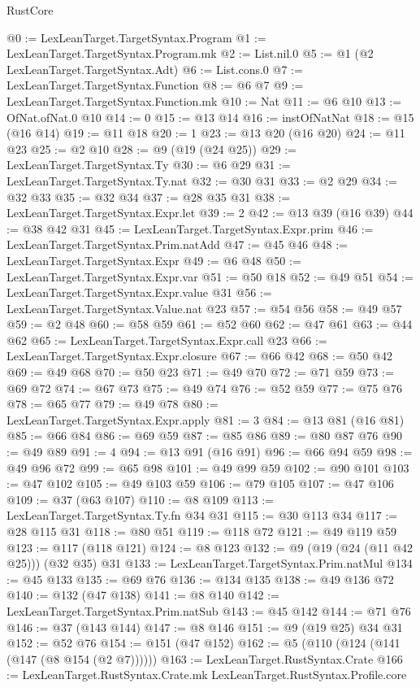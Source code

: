 \begin{lexlean}{RustCore}
\begin{coremodule}
{\begin{coremodule}
{{{{{{{{{@0 := LexLeanTarget.TargetSyntax.Program
@1 := LexLeanTarget.TargetSyntax.Program.mk
@2 := List.nil.{0}
@5 := @1 (@2 LexLeanTarget.TargetSyntax.Adt)
@6 := List.cons.{0}
@7 := LexLeanTarget.TargetSyntax.Function
@8 := @6 @7
@9 := LexLeanTarget.TargetSyntax.Function.mk
@10 := Nat
@11 := @6 @10
@13 := OfNat.ofNat.{0} @10
@14 := 0
@15 := @13 @14
@16 := instOfNatNat
@18 := @15 (@16 @14)
@19 := @11 @18
@20 := 1
@23 := @13 @20 (@16 @20)
@24 := @11 @23
@25 := @2 @10
@28 := @9 (@19 (@24 @25))
@29 := LexLeanTarget.TargetSyntax.Ty
@30 := @6 @29
@31 := LexLeanTarget.TargetSyntax.Ty.nat
@32 := @30 @31
@33 := @2 @29
@34 := @32 @33
@35 := @32 @34
@37 := @28 @35 @31
@38 := LexLeanTarget.TargetSyntax.Expr.let
@39 := 2
@42 := @13 @39 (@16 @39)
@44 := @38 @42 @31
@45 := LexLeanTarget.TargetSyntax.Expr.prim
@46 := LexLeanTarget.TargetSyntax.Prim.natAdd
@47 := @45 @46
@48 := LexLeanTarget.TargetSyntax.Expr
@49 := @6 @48
@50 := LexLeanTarget.TargetSyntax.Expr.var
@51 := @50 @18
@52 := @49 @51
@54 := LexLeanTarget.TargetSyntax.Expr.value @31
@56 := LexLeanTarget.TargetSyntax.Value.nat @23
@57 := @54 @56
@58 := @49 @57
@59 := @2 @48
@60 := @58 @59
@61 := @52 @60
@62 := @47 @61
@63 := @44 @62
@65 := LexLeanTarget.TargetSyntax.Expr.call @23
@66 := LexLeanTarget.TargetSyntax.Expr.closure
@67 := @66 @42
@68 := @50 @42
@69 := @49 @68
@70 := @50 @23
@71 := @49 @70
@72 := @71 @59
@73 := @69 @72
@74 := @67 @73
@75 := @49 @74
@76 := @52 @59
@77 := @75 @76
@78 := @65 @77
@79 := @49 @78
@80 := LexLeanTarget.TargetSyntax.Expr.apply
@81 := 3
@84 := @13 @81 (@16 @81)
@85 := @66 @84
@86 := @69 @59
@87 := @85 @86
@89 := @80 @87 @76
@90 := @49 @89
@91 := 4
@94 := @13 @91 (@16 @91)
@96 := @66 @94 @59
@98 := @49 @96 @72
@99 := @65 @98
@101 := @49 @99 @59
@102 := @90 @101
@103 := @47 @102
@105 := @49 @103 @59
@106 := @79 @105
@107 := @47 @106
@109 := @37 (@63 @107)
@110 := @8 @109
@113 := LexLeanTarget.TargetSyntax.Ty.fn @34 @31
@115 := @30 @113 @34
@117 := @28 @115 @31
@118 := @80 @51
@119 := @118 @72
@121 := @49 @119 @59
@123 := @117 (@118 @121)
@124 := @8 @123
@132 := @9 (@19 (@24 (@11 @42 @25))) (@32 @35) @31
@133 := LexLeanTarget.TargetSyntax.Prim.natMul
@134 := @45 @133
@135 := @69 @76
@136 := @134 @135
@138 := @49 @136 @72
@140 := @132 (@47 @138)
@141 := @8 @140
@142 := LexLeanTarget.TargetSyntax.Prim.natSub
@143 := @45 @142
@144 := @71 @76
@146 := @37 (@143 @144)
@147 := @8 @146
@151 := @9 (@19 @25) @34 @31
@152 := @52 @76
@154 := @151 (@47 @152)
@162 := @5 (@110 (@124 (@141 (@147 (@8 @154 (@2 @7))))))
@163 := LexLeanTarget.RustSyntax.Crate
@166 := LexLeanTarget.RustSyntax.Crate.mk LexLeanTarget.RustSyntax.Profile.core
}}}}}}}}}
\end{coremodule}}
\end{coremodule}
\end{lexlean}
